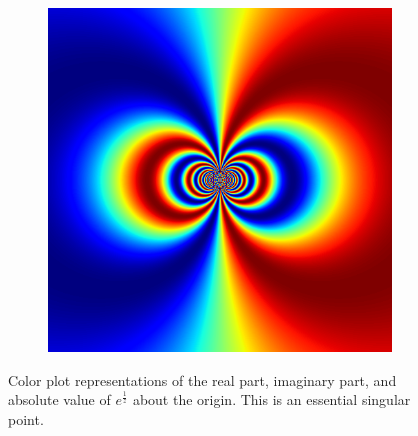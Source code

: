 \begin{figure}
\begin{subfigure}{.32\textwidth}
\end{subfigure}
\begin{subfigure}{.32\textwidth}
\includegraphics[width=\textwidth]{exp_inv_abs.png}
\end{subfigure}
\caption{Color plot representations of the real part, imaginary part, and absolute value of $e^{\frac{1}{z}}$ about the origin.
This is an essential singular point.}
\label{fig:exp_inv_color}
\end{figure}

